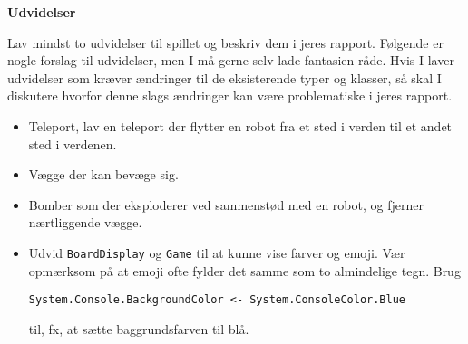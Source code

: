 \textbf{Udvidelser}

Lav mindst to udvidelser til spillet og beskriv dem i jeres
rapport. Følgende er nogle forslag til udvidelser, men I må gerne selv lade
fantasien råde. Hvis I laver udvidelser som kræver ændringer til de
eksisterende typer og klasser, så skal I diskutere hvorfor denne slags
ændringer kan være problematiske i jeres rapport.

\begin{itemize}
\item Teleport, lav en teleport der flytter en robot fra et sted i
  verden til et andet sted i verdenen.
\item Vægge der kan bevæge sig.
\item Bomber som der eksploderer ved sammenstød med en robot, og
  fjerner nærtliggende vægge.
\item Udvid \lstinline{BoardDisplay} og \lstinline{Game} til at kunne
  vise farver og emoji. Vær opmærksom på at emoji ofte fylder det
  samme som to almindelige tegn. Brug
\begin{lstlisting}
System.Console.BackgroundColor <- System.ConsoleColor.Blue
\end{lstlisting}
  til, fx, at sætte baggrundsfarven til blå.
\end{itemize}

